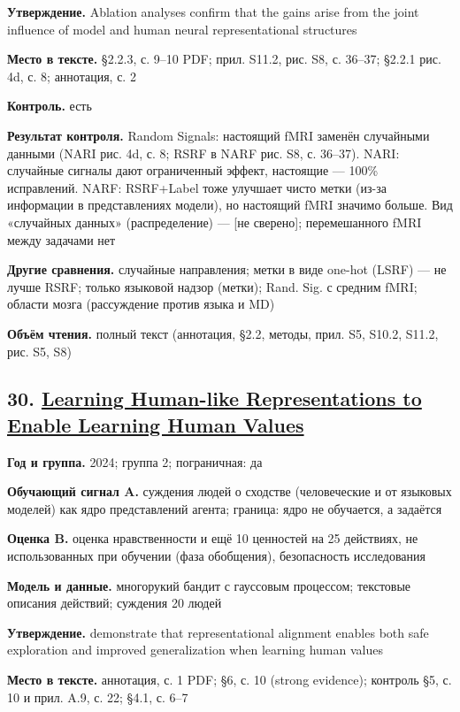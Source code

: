 \textbf{Утверждение.} Ablation analyses confirm that the gains arise from the joint influence of model and human neural representational structures

\textbf{Место в тексте.} §2.2.3, с. 9–10 PDF; прил. S11.2, рис. S8, с. 36–37; §2.2.1 рис. 4d, с. 8; аннотация, с. 2

\textbf{Контроль.} есть

\textbf{Результат контроля.} Random Signals: настоящий fMRI заменён случайными данными (NARI рис. 4d, с. 8; RSRF в NARF рис. S8, с. 36–37). NARI: случайные сигналы дают ограниченный эффект, настоящие — 100\% исправлений. NARF: RSRF+Label тоже улучшает чисто метки (из-за информации в представлениях модели), но настоящий fMRI значимо больше. Вид «случайных данных» (распределение) — [не сверено]; перемешанного fMRI между задачами нет

\textbf{Другие сравнения.} случайные направления; метки в виде one-hot (LSRF) — не лучше RSRF; только языковой надзор (метки); Rand. Sig. с средним fMRI; области мозга (рассуждение против языка и MD)

\textbf{Объём чтения.} полный текст (аннотация, §2.2, методы, прил. S5, S10.2, S11.2, рис. S5, S8)


\subsection*{30. \href{https://doi.org/10.52202/079017-0952}{Learning Human-like Representations to Enable Learning Human Values}}

\textbf{Год и группа.} 2024; группа 2; пограничная: да

\textbf{Обучающий сигнал A.} суждения людей о сходстве (человеческие и от языковых моделей) как ядро представлений агента; граница: ядро не обучается, а задаётся

\textbf{Оценка B.} оценка нравственности и ещё 10 ценностей на 25 действиях, не использованных при обучении (фаза обобщения), безопасность исследования

\textbf{Модель и данные.} многорукий бандит с гауссовым процессом; текстовые описания действий; суждения 20 людей

\textbf{Утверждение.} demonstrate that representational alignment enables both safe exploration and improved generalization when learning human values

\textbf{Место в тексте.} аннотация, с. 1 PDF; §6, с. 10 (strong evidence); контроль §5, с. 10 и прил. A.9, с. 22; §4.1, с. 6–7

